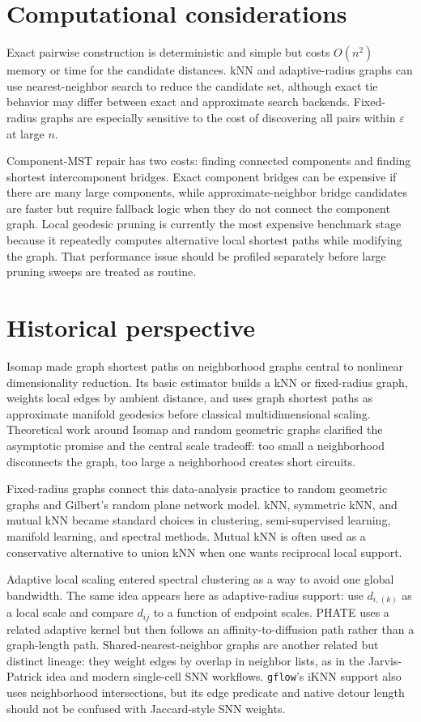 \documentclass[11pt]{article}
\newcommand{\eps}{\varepsilon}
\begin{document}
\section{Computational considerations}

Exact pairwise construction is deterministic and simple but costs \(O(n^2)\) memory or time
for the candidate distances.  kNN and adaptive-radius graphs can use nearest-neighbor
search to reduce the candidate set, although exact tie behavior may differ between exact
and approximate search backends.  Fixed-radius graphs are especially sensitive to the cost
of discovering all pairs within \(\eps\) at large \(n\).

Component-MST repair has two costs: finding connected components and finding shortest
intercomponent bridges.  Exact component bridges can be expensive if there are many large
components, while approximate-neighbor bridge candidates are faster but require fallback
logic when they do not connect the component graph.  Local geodesic pruning is currently
the most expensive benchmark stage because it repeatedly computes alternative local
shortest paths while modifying the graph.  That performance issue should be profiled
separately before large pruning sweeps are treated as routine.

\section{Historical perspective}

Isomap made graph shortest paths on neighborhood graphs central to nonlinear dimensionality
reduction.  Its basic estimator builds a kNN or fixed-radius graph, weights local edges by
ambient distance, and uses graph shortest paths as approximate manifold geodesics before
classical multidimensional scaling.  Theoretical work around Isomap and random geometric
graphs clarified the asymptotic promise and the central scale tradeoff: too small a
neighborhood disconnects the graph, too large a neighborhood creates short circuits.

Fixed-radius graphs connect this data-analysis practice to random geometric graphs and
Gilbert's random plane network model.  kNN, symmetric kNN, and mutual kNN became standard
choices in clustering, semi-supervised learning, manifold learning, and spectral methods.
Mutual kNN is often used as a conservative alternative to union kNN when one wants
reciprocal local support.

Adaptive local scaling entered spectral clustering as a way to avoid one global bandwidth.
The same idea appears here as adaptive-radius support: use \(d_{i,(k)}\) as a local scale
and compare \(d_{ij}\) to a function of endpoint scales.  PHATE uses a related adaptive
kernel but then follows an affinity-to-diffusion path rather than a graph-length path.
Shared-nearest-neighbor graphs are another related but distinct lineage: they weight edges
by overlap in neighbor lists, as in the Jarvis-Patrick idea and modern single-cell SNN
workflows.  \texttt{gflow}'s iKNN support also uses neighborhood intersections, but its edge
predicate and native detour length should not be confused with Jaccard-style SNN weights.
\end{document}
